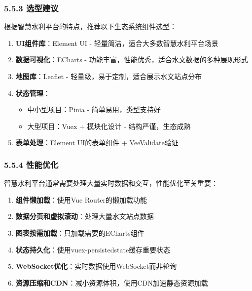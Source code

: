 \subsubsection{5.5.3 选型建议}\label{ux9009ux578bux5efaux8bae}

根据智慧水利平台的特点，推荐以下生态系统组件选型：

\begin{enumerate}
\def\labelenumi{\arabic{enumi}.}
\tightlist
\item
  \textbf{UI组件库}：Element UI - 轻量简洁，适合大多数智慧水利平台场景
\item
  \textbf{数据可视化}：ECharts -
  功能丰富，性能优秀，适合水文数据的多种展现形式
\item
  \textbf{地图库}：Leaflet - 轻量级，易于定制，适合展示水文站点分布
\item
  \textbf{状态管理}：

  \begin{itemize}
  \tightlist
  \item
    中小型项目：Pinia - 简单易用，类型支持好
  \item
    大型项目：Vuex + 模块化设计 - 结构严谨，生态成熟
  \end{itemize}
\item
  \textbf{表单处理}：Element UI的表单组件 + VeeValidate验证
\end{enumerate}

\subsubsection{5.5.4 性能优化}\label{ux6027ux80fdux4f18ux5316}

智慧水利平台通常需要处理大量实时数据和交互，性能优化至关重要：

\begin{enumerate}
\def\labelenumi{\arabic{enumi}.}
\tightlist
\item
  \textbf{组件懒加载}：使用Vue Router的懒加载功能
\item
  \textbf{数据分页和虚拟滚动}：处理大量水文站点数据
\item
  \textbf{图表按需加载}：只加载需要的ECharts组件
\item
  \textbf{状态持久化}：使用vuex-persistedstate缓存重要状态
\item
  \textbf{WebSocket优化}：实时数据使用WebSocket而非轮询
\item
  \textbf{资源压缩和CDN}：减小资源体积，使用CDN加速静态资源加载
\end{enumerate}
